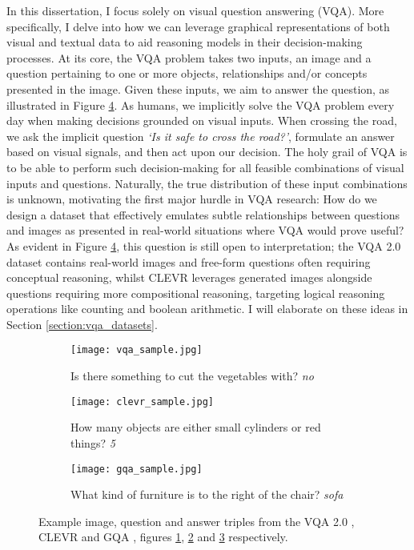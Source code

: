 In this dissertation, I focus solely on visual question answering (VQA). More specifically, I delve into how we can leverage graphical representations of both visual and textual data to aid reasoning models in their decision-making processes. At its core, the VQA problem takes two inputs, an image and a question pertaining to one or more objects, relationships and/or concepts presented in the image. Given these inputs, we aim to answer the question, as illustrated in Figure \ref{fig:dataset_samples}. As humans, we implicitly solve the VQA problem every day when making decisions grounded on visual inputs. When crossing the road, we ask the implicit question \textit{`Is it safe to cross the road?'}, formulate an answer based on visual signals, and then act upon our decision. The holy grail of VQA is to be able to perform such decision-making for all feasible combinations of visual inputs and questions. Naturally, the true distribution of these input combinations is unknown, motivating the first major hurdle in VQA research: How do we design a dataset that effectively emulates subtle relationships between questions and images as presented in real-world situations where VQA would prove useful? As evident in Figure \ref{fig:dataset_samples}, this question is still open to interpretation; the VQA 2.0 dataset contains real-world images and free-form questions often requiring conceptual reasoning, whilst CLEVR leverages generated images alongside questions requiring more compositional reasoning, targeting logical reasoning operations like counting and boolean arithmetic. I will elaborate on these ideas in Section \ref{section:vqa_datasets}.

\begin{figure}
  \begin{subfigure}[t]{0.3\textwidth}
    \centering
    \texttt{[image: vqa\_sample.jpg]} 
    \caption{Is there something to cut the vegetables with? \textit{no}}
    \label{fig:vqa_sample}
  \end{subfigure}
  \hfill
  \begin{subfigure}[t]{0.3\textwidth}
    \centering
    \texttt{[image: clevr\_sample.jpg]} 
    \caption{How many objects are either small cylinders or red things? \textit{5}}
    \label{fig:clevr_sample}
  \end{subfigure}
  \hfill
  \begin{subfigure}[t]{0.3\textwidth}
    \centering
    \texttt{[image: gqa\_sample.jpg]} 
    \caption{What kind of furniture is to the right of the chair? \textit{sofa}}
    \label{fig:gqa_sample}
  \end{subfigure}
  \caption[Example instances from the VQA 2.0, CLEVR and GQA datasets.]{Example image, question and answer triples from the VQA 2.0 \cite{goyal2017making}, CLEVR \cite{johnson2017clevr} and GQA \cite{hudson2019gqa}, figures \ref{fig:vqa_sample}, \ref{fig:clevr_sample} and \ref{fig:gqa_sample} respectively.}
  \label{fig:dataset_samples}
\end{figure}

